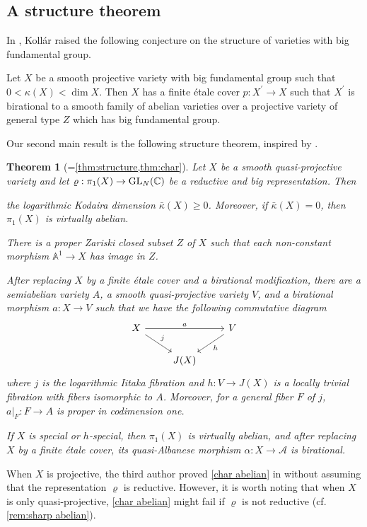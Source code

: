\documentclass[11pt,english]{smfart}
\theoremstyle{plain}
\newtheorem{thmx}{Theorem}
\theoremstyle{definition}
\theoremstyle{remark}
\numberwithin{equation}{subsection}
\theoremstyle{plain}
\newcommand{\cA}{\mathcal A}
\newcommand{\bA}{\mathbb{A}}
\newcommand{\bC}{\mathbb{C}}
\begin{document}
\subsection{A structure theorem}
In \cite[Conjecture 4.18]{Kol95}, Kollár raised the following conjecture on the structure of varieties with big fundamental group.
\begin{conj}[Koll\'ar]\label{conj:Kollar}
	 Let $X$ be a smooth projective variety with big fundamental group such that $0<\kappa(X)<\operatorname{dim} X$. Then $X$ has a finite étale cover $p: X^{\prime} \rightarrow X$ such that $X^{\prime}$ is birational to a smooth family of abelian varieties over a projective variety of general type $Z$ which has big fundamental group. 
\end{conj}
 Our second main result  is  the following structure theorem, inspired by  .
\begin{thmx}[=\cref{thm:structure,thm:char}]
\label{thm:20230510}
	Let $X$ be a   smooth quasi-projective variety and let $\varrho:\pi_1(X)\to {\rm GL}_N(\bC)$ be a reductive and big representation. Then
	\begin{thmenum}
	\item the logarithmic Kodaira dimension $\bar{\kappa}(X)\geq 0$. Moreover, if $\bar{\kappa}(X)=0$, then   $\pi_1(X)$ is virtually abelian.
	\item There is a proper Zariski closed subset $Z$ of $X$ such that each non-constant morphism $\bA^1\to X$ has image in $Z$.
	\item After replacing $X$ by a finite \'etale cover and a birational modification, there are a semiabelian variety $A$, a smooth quasi-projective variety $V$, and a birational morphism $a:X\to V$ such that we have the following commutative diagram
		\begin{equation*}
			\begin{tikzcd}
				X \arrow[rr,    "a"] \arrow[dr,  "j"] & & V \arrow[ld, "h"]\\
				& J(X)&
			\end{tikzcd}
		\end{equation*}
	where $j$ is the logarithmic Iitaka fibration and $h:V\to J(X)$ is a  locally trivial fibration with fibers isomorphic to $A$.   Moreover, for a   general fiber $F$ of $j$, $a|_{F}:F\to  A$ is proper in codimension one. 
		\item \label{char abelian} If $X$ is   special or $h$-special, then $\pi_1(X)$ is virtually abelian, and after replacing $X$ by a finite \'etale cover, its quasi-Albanese morphism $\alpha:X\to \cA$ is birational.  
 		\end{thmenum} 
\end{thmx} 
When $X$ is projective, the third author proved \cref{char abelian} in \cite{Yam10} without assuming that the representation $\varrho$ is reductive. However, it is worth noting that when $X$ is only quasi-projective,   \cref{char abelian} might fail if $\varrho$ is not reductive (cf. \cref{rem:sharp abelian}).   
  
\end{document}
